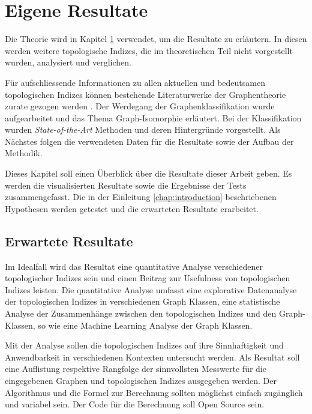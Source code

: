 \chapter{Eigene Resultate} \label{chap:results}

Die Theorie wird in Kapitel \ref{chap:results} verwendet, um die Resultate zu erläutern.
In diesen werden weitere topologische Indizes, die im theoretischen Teil nicht vorgestellt wurden, analysiert und verglichen.

Für aufschliessende Informationen zu allen aktuellen und bedeutsamen topologischen Indizes können bestehende Literaturwerke der Graphentheorie zurate gezogen werden \cite{dehmer_information_2012,ravi_computation_2022,amin_analysis_2022,sarkar_neighbourhood_2021}.
Der Werdegang der Graphenklassifikation wurde aufgearbeitet und das Thema Graph-Isomorphie erläutert.
Bei der Klassifikation wurden \textit{State-of-the-Art} Methoden und deren Hintergründe vorgestellt.
Als Nächstes folgen die verwendeten Daten für die Resultate sowie der Aufbau der Methodik.

Dieses Kapitel soll einen Überblick über die Resultate dieser Arbeit geben.
Es werden die visualisierten Resultate sowie die Ergebnisse der Tests zusammengefasst.
Die in der Einleitung \ref{chap:introduction} beschriebenen Hypothesen werden getestet und die erwarteten Resultate erarbeitet.

\newpage

\section{Erwartete Resultate}

Im Idealfall wird das Resultat eine quantitative Analyse verschiedener topologischer Indizes sein und einen Beitrag zur Usefulness von topologischen Indizes leisten.
Die quantitative Analyse umfasst eine explorative Datenanalyse der topologischen Indizes in verschiedenen Graph Klassen, eine statistische Analyse der Zusammenhänge zwischen den topologischen Indizes und den Graph-Klassen, so wie eine Machine Learning Analyse der Graph Klassen.

Mit der Analyse sollen die topologischen Indizes auf ihre Sinnhaftigkeit und Anwendbarkeit in verschiedenen Kontexten untersucht werden.
Als Resultat soll eine Auflistung respektive Rangfolge der sinnvollsten Messwerte für die eingegebenen Graphen und topologischen Indizes ausgegeben werden.
Der Algorithmus und die Formel zur Berechnung sollten möglichst einfach zugänglich und variabel sein. Der Code für die Berechnung soll Open Source sein.

